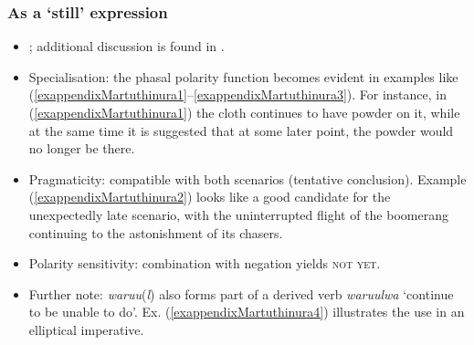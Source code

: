 \subsubsection{As a \lq{}still\rq{} expression}
\begin{itemize}
	\item \textcite[130–131]{Dench1994}; additional discussion is found in \textcite{SchultzeBerndt2002}.
	\item Specialisation: the phasal polarity function becomes evident in examples like (\ref{exappendixMartuthinura1}–\ref{exappendixMartuthinura3}). For instance, in (\ref{exappendixMartuthinura1}) the cloth continues to have powder on it, while at the same time it is suggested that at some later point, the powder would no longer be there.
	\item Pragmaticity: compatible with both scenarios (tentative conclusion). Example (\ref{exappendixMartuthinura2}) looks like a good candidate for the unexpectedly late scenario, with the uninterrupted flight of the boomerang continuing to the astonishment of its chasers.
	\item Polarity sensitivity: combination with negation yields \textsc{not yet}.
	\item Further note: \textit{waruu}(\textit{l}) also forms part of a derived verb \textit{waruulwa} \lq continue to be unable to do'. Ex. (\ref{exappendixMartuthinura4}) illustrates the use in an elliptical imperative.
\end{itemize}\largerpage
